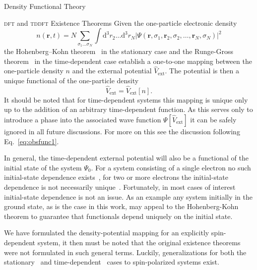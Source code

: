 \documentclass[a5paper, 9 pt]{extreport}
\begin{document}
\begin{chapter}{Density Functional Theory \label{chap:dft}}
\begin{section}{\textsc{dft} and \textsc{tddft} Existence Theorems \label{sec:dft}}
      Given the one-particle electronic density
      \begin{equation} \label{eq:dendef1}
         n(\mathbf{r}, t) = N \sum\limits_{\sigma_1 \dots \sigma_N} \int \mathrm{d}^3 r_2 \dots
                              \mathrm{d}^3 r_N \left| \Psi(\mathbf{r}, \sigma_1, \mathbf{r}_2,
                              \sigma_2, \dots, \mathbf{r}_N, \sigma_N) \right|^2
      \end{equation}
      the Hohenberg–Kohn theorem~\cite{hk-theorem} in the stationary case and the Runge-Gross
      theorem~\cite{rgt} in the time-dependent case establish a one-to-one mapping between the
      one-particle density $n$ and the external potential $\hat{V}_\mathrm{ext}$. The potential is
      then a unique functional of the one-particle density
      \begin{equation} \label{eq:vext-func}
         \hat{V}_\mathrm{ext} = \hat{V}_\mathrm{ext} [n].
      \end{equation}
      It should be noted that for time-dependent systems this mapping is unique only up to the addition
      of an arbitrary time-dependent function. As this serves only to introduce a phase into the
      associated wave function $\Psi[\hat{V}_\mathrm{ext}]$ it can be safely ignored in all future
      discussions. For more on this see the discussion following Eq.~\eqref{eq:obsfunc1}.

      In general, the time-dependent external potential will also be a functional of the initial state
      of the system $\Psi_0$. For a system consisting of a single electron no such initial-state
      dependence exists~\cite{initial1, initial1-erratum}, for two or more electrons the initial-state
      dependence is not necessarily unique~\cite{initial2, initial2-re, initial2-rere, initial3}.
      Fortunately, in most cases of interest initial-state dependence is not an issue. As an example
      any system initially in the ground state, as is the case in this work, may appeal to the
      Hohenberg-Kohn theorem to guarantee that functionals depend uniquely on the initial state.

      We have formulated the density-potential mapping for an explicitly spin-dependent system, it
      then must be noted that the original existence theorems were not formulated in such general terms.
      Luckily, generalizations for both the stationary~\cite{spin-dep1, spin-dep2} and
      time-dependent~\cite{td-spindep} cases to spin-polarized systems exist.


\end{section}
\end{chapter}
\end{document}
